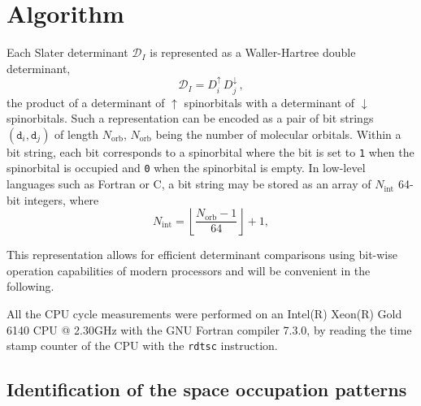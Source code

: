 \documentclass[aip,jcp,reprint,showkeys]{revtex4-1}
\newcommand{\md}{\mathtt{d}}
\newcommand{\mD}{\mathcal{D}}
\newcommand{\up}{\uparrow}
\newcommand{\dn}{\downarrow}
\newcommand{\Nint}{{N_\text{int}}}
\newcommand{\Norb}{{N_\text{orb}}}
\newcommand{\one}{{\texttt{1}}}
\newcommand{\zero}{{\texttt{0}}}
\begin{document}
\section{Algorithm}

Each Slater determinant $\mD_I$ is represented as a Waller-Hartree double
determinant,\cite{Pauncz_1989}
\begin{equation}
 \label{eq:di}
 \mD_I = D_i^\up \, D_j^\dn\, ,
\end{equation}
the product of a determinant of
$\up$ spinorbitals with a determinant of $\dn$ spinorbitals.
Such a representation can be encoded as a pair of bit strings $(\md_i,\md_j)$ of length $\Norb$,  $\Norb$ being the number of molecular orbitals.
Within a bit string, each bit corresponds to a spinorbital where the bit is set to \one{} when the
spinorbital is occupied and \zero{} when the spinorbital is empty. In low-level languages such as Fortran or C, a bit
string may be stored as an array of $\Nint$ 64-bit integers, where 
\begin{equation}
  \Nint = \left \lfloor \frac{\Norb-1}{64} \right \rfloor + 1,
\end{equation}

This representation allows for efficient determinant comparisons using bit-wise operation 
capabilities of modern processors\cite{Scemama_2013} and will be convenient in the following.

All the CPU cycle measurements were performed on an Intel(R) Xeon(R)
Gold 6140 CPU @ 2.30GHz with the GNU Fortran compiler 7.3.0, by reading
the time stamp counter of the CPU with the \texttt{rdtsc} instruction.


\subsection{Identification of the space occupation patterns}
\end{document}
